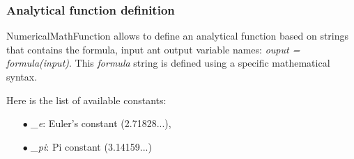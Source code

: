 \subsubsection{Analytical function definition}
\label{analytical_function_definition}
NumericalMathFunction allows to define an analytical function based on strings that contains the formula, input ant output variable names: \textit{ouput = formula(input)}.
This \textit{formula} string is defined using a specific mathematical syntax.

Here is the list of available constants:
\begin{itemize}
\item[$\bullet$] \textit{\_e}:  Euler's constant (2.71828...),
\item[$\bullet$] \textit{\_pi}: Pi constant (3.14159...)
\end{itemize}

